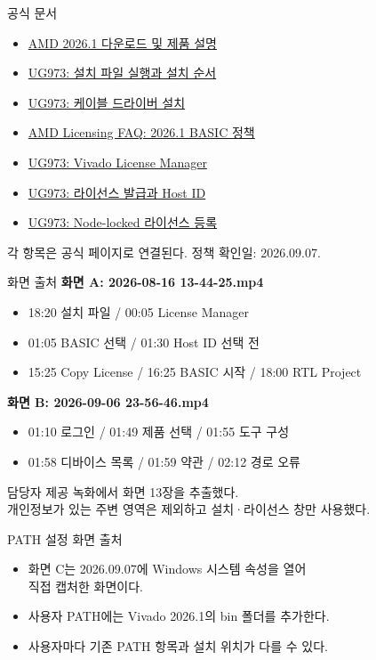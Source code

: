 \documentclass[aspectratio=169,11pt]{beamer}
\begin{document}
\begin{frame}{공식 문서}
\small
\begin{itemize}
\item \href{https://www.amd.com/en/support/downloads/adaptive-socs-and-fpgas/development-tools/2026-1.html}{AMD 2026.1 다운로드 및 제품 설명}
\item \href{https://docs.amd.com/r/en-US/ug973-vivado-release-notes-install-license/Run-the-Installation-File}{UG973: 설치 파일 실행과 설치 순서}
\item \href{https://docs.amd.com/r/en-US/ug973-vivado-release-notes-install-license/Install-Cable-Drivers}{UG973: 케이블 드라이버 설치}
\item \href{https://www.amd.com/en/products/software/adaptive-socs-and-fpgas/licensing-faq.html}{AMD Licensing FAQ: 2026.1 BASIC 정책}
\item \href{https://docs.amd.com/r/en-US/ug973-vivado-release-notes-install-license/Managing-Licenses-with-the-Vivado-License-Manager}{UG973: Vivado License Manager}
\item \href{https://docs.amd.com/r/en-US/ug973-vivado-release-notes-install-license/Create-and-Generate-a-License-Key-File}{UG973: 라이선스 발급과 Host ID}
\item \href{https://docs.amd.com/r/en-US/ug973-vivado-release-notes-install-license/Install-Certificate-Based-Node-Locked-License-Key-File}{UG973: Node-locked 라이선스 등록}
\end{itemize}
\vspace{0.2cm}
각 항목은 공식 페이지로 연결된다. 정책 확인일: 2026.09.07.
\end{frame}

\begin{frame}{화면 출처}
\small
\textbf{화면 A: 2026-08-16 13-44-25.mp4}
\begin{itemize}
\item 18:20 설치 파일 / 00:05 License Manager
\item 01:05 BASIC 선택 / 01:30 Host ID 선택 전
\item 15:25 Copy License / 16:25 BASIC 시작 / 18:00 RTL Project
\end{itemize}
\vspace{0.15cm}
\textbf{화면 B: 2026-09-06 23-56-46.mp4}
\begin{itemize}
\item 01:10 로그인 / 01:49 제품 선택 / 01:55 도구 구성
\item 01:58 디바이스 목록 / 01:59 약관 / 02:12 경로 오류
\end{itemize}
\vspace{0.15cm}
{\footnotesize 담당자 제공 녹화에서 화면 13장을 추출했다.\\
개인정보가 있는 주변 영역은 제외하고 설치·라이선스 창만 사용했다.}
\end{frame}

\begin{frame}{PATH 설정 화면 출처}
\begin{itemize}
\item 화면 C는 2026.09.07에 Windows 시스템 속성을 열어\\
직접 캡처한 화면이다.
\item 사용자 PATH에는 Vivado 2026.1의 bin 폴더를 추가한다.
\item 사용자마다 기존 PATH 항목과 설치 위치가 다를 수 있다.
\end{itemize}
\end{frame}
\end{document}
